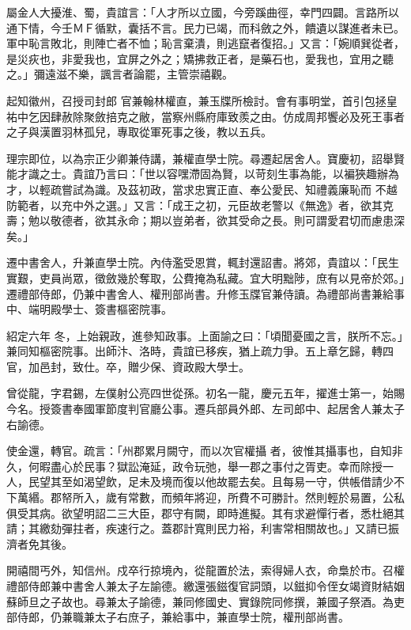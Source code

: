 \begin{pinyinscope}
 屬金人大擾淮、蜀，貴誼言：「人才所以立國，今旁蹊曲徑，幸門四闢。言路所以通下情，今壬ＭＦ循默，囊括不言。民力已竭，而科斂之外，饋遺以謀進者未已。軍中恥言敗北，則陣亡者不恤；恥言棄潰，則逃竄者復招。」又言：「婉順巽從者，是災疢也，非愛我也，宜屏之外之；矯拂救正者，是藥石也，愛我也，宜用之聽之。」彌遠滋不樂，諷言者論罷，主管崇禧觀。



 起知徽州，召授司封郎
 官兼翰林權直，兼玉牒所檢討。會有事明堂，首引包拯皇祐中乞因肆赦除聚斂掊克之敝，當察州縣府庫致羨之由。仿成周邦饗必及死王事者之子與漢置羽林孤兒，專取從軍死事之後，教以五兵。



 理宗即位，以為宗正少卿兼侍講，兼權直學士院。尋遷起居舍人。寶慶初，詔舉賢能才識之士。貴誼乃言曰：「世以容嘿滯固為賢，以苛刻生事為能，以褊狹趣辦為才，以輕疏嘗試為識。及茲初政，當求忠實正直、奉公愛民、知禮義廉恥而
 不越防範者，以充中外之選。」又言：「成王之初，元臣故老警以《無逸》者，欲其克壽；勉以敬德者，欲其永命；期以豈弟者，欲其受命之長。則可謂愛君切而慮患深矣。」



 遷中書舍人，升兼直學士院。內侍濫受恩賞，輒封還詔書。將郊，貴誼以：「民生實艱，吏員尚眾，徵斂幾於奪取，公費掩為私藏。宜大明黜陟，庶有以見帝於郊。」遷禮部侍郎，仍兼中書舍人、權刑部尚書。升修玉牒官兼侍讀。為禮部尚書兼給事中、端明殿學士、簽書樞密院事。



 紹定六年
 冬，上始親政，進參知政事。上面諭之曰：「頃聞憂國之言，朕所不忘。」兼同知樞密院事。出師汴、洛時，貴誼已移疾，猶上疏力爭。五上章乞歸，轉四官，加邑封，致仕。卒，贈少保、資政殿大學士。



 曾從龍，字君錫，左僕射公亮四世從孫。初名一龍，慶元五年，擢進士第一，始賜今名。授簽書奉國軍節度判官廳公事。遷兵部員外郎、左司郎中、起居舍人兼太子右諭德。



 使金還，轉官。疏言：「州郡累月闕守，而以次官權攝
 者，彼惟其攝事也，自知非久，何暇盡心於民事？獄訟淹延，政令玩弛，舉一郡之事付之胥吏。幸而除授一人，民望其至如渴望飲，足未及境而復以他故罷去矣。且每易一守，供帳借請少不下萬緡。郡帑所入，歲有常數，而頻年將迎，所費不可勝計。然則輕於易置，公私俱受其病。欲望明詔二三大臣，郡守有闕，即時進擬。其有求避憚行者，悉杜絕其請；其繳劾彈拄者，疾速行之。蓋郡計寬則民力裕，利害常相關故也。」又請已振濟者免其後。



 開禧間丐外，知信州。戍卒行掠境內，從龍置於法，索得婦人衣，命梟於市。召權禮部侍郎兼中書舍人兼太子左諭德。繳還張鎡復官詞頭，以鎡抑令侄女竭資財結姻蘇師旦之子故也。尋兼太子諭德，兼同修國史、實錄院同修撰，兼國子祭酒。為吏部侍郎，仍兼職兼太子右庶子，兼給事中，兼直學士院，權刑部尚書。




\end{pinyinscope}
